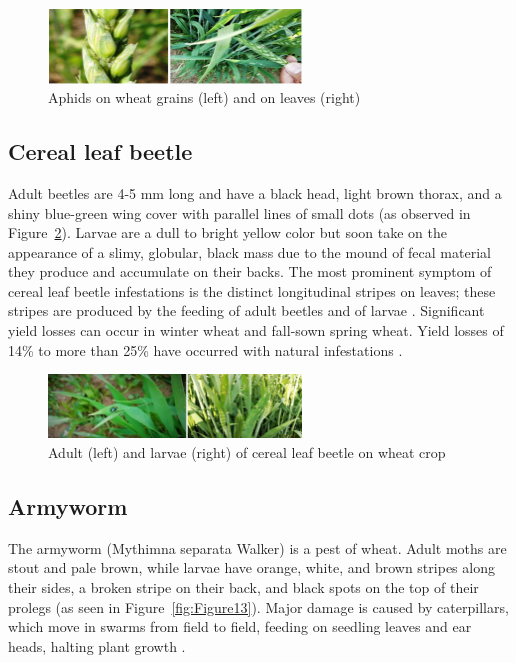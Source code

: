 \begin{figure}[H]
    \centering
    \includegraphics[width=0.6\textwidth]{chapters/chapter2/images/Figure11.png}
    \caption{Aphids on wheat grains (left) and on leaves (right) \protect\parencite{farook2019insect}}
    \label{fig:Figure11}
\end{figure}

\subsection{Cereal leaf beetle}
Adult beetles are 4-5 mm long and have a black head, light brown thorax, and a shiny blue-green wing cover with parallel lines of small dots (as observed in Figure~\ref{fig:Figure12}). Larvae are a dull to bright yellow color but soon take on the appearance of a slimy, globular, black mass due to the mound of fecal material they produce and accumulate on their backs. The most prominent symptom of cereal leaf beetle infestations is the distinct longitudinal stripes on leaves; these stripes are produced by the feeding of adult beetles and of larvae \parencite{duveiller2012wheat}.
Significant yield losses can occur in winter wheat and fall-sown spring wheat. Yield losses of 14\% to more than 25\% have occurred with natural infestations \parencite{duveiller2012wheat}.


\begin{figure}[H]
    \centering
    \includegraphics[width=0.6\textwidth]{chapters/chapter2/images/Figure12.png}
    \caption{Adult (left) and larvae (right) of cereal leaf beetle on wheat crop \protect\parencite{farook2019insect}}
    \label{fig:Figure12}
\end{figure}


\subsection{Armyworm}
The armyworm (Mythimna separata Walker) is a pest of wheat. Adult moths are stout and pale brown, while larvae have orange, white, and brown stripes along their sides, a broken stripe on their back, and black spots on the top of their prolegs (as seen in Figure~\ref{fig:Figure13}). Major damage is caused by caterpillars, which move in swarms from field to field, feeding on seedling leaves and ear heads, halting plant growth \parencite{farook2019insect}.

